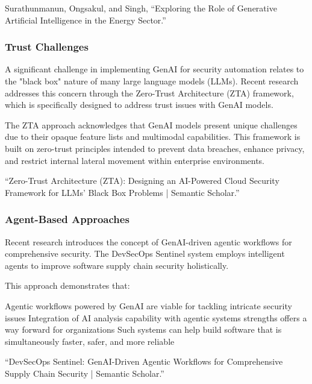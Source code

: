 Surathunmanun, Ongsakul, and Singh, “Exploring the Role of Generative Artificial Intelligence in the Energy Sector.”


\subsubsection{Trust Challenges} %
\label{sec:Trust Challenges}

A significant challenge in implementing GenAI for security automation relates to the "black box" nature of many large language models (LLMs). Recent research addresses this concern through the Zero-Trust Architecture (ZTA) framework, which is specifically designed to address trust issues with GenAI models.

The ZTA approach acknowledges that GenAI models present unique challenges due to their opaque feature lists and multimodal capabilities. This framework is built on zero-trust principles intended to prevent data breaches, enhance privacy, and restrict internal lateral movement within enterprise environments.

“Zero-Trust Architecture (ZTA): Designing an AI-Powered Cloud Security Framework for LLMs’ Black Box Problems | Semantic Scholar.”


\subsubsection{Agent-Based Approaches} %
\label{sec:Agent-Based Approaches}

Recent research introduces the concept of GenAI-driven agentic workflows for comprehensive security. The DevSecOps Sentinel system employs intelligent agents to improve software supply chain security holistically.

This approach demonstrates that:

Agentic workflows powered by GenAI are viable for tackling intricate security issues
Integration of AI analysis capability with agentic systems strengths offers a way forward for organizations
Such systems can help build software that is simultaneously faster, safer, and more reliable

“DevSecOps Sentinel: GenAI-Driven Agentic Workflows for Comprehensive Supply Chain Security | Semantic Scholar.”


